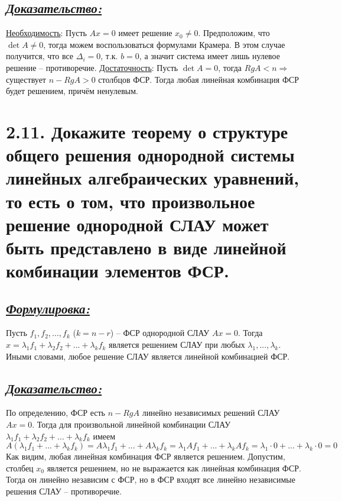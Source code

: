 \documentclass{article}
\begin{document}
\subsection*{\Large \underline{\textit{Доказательство: }}}
\underline{Необходимость}:
\newline Пусть $Ax = 0$ имеет решение $x_0 \ne 0$. Предположим, что $\det{A} \ne 0$, тогда можем воспользоваться формулами Крамера. В этом случае получится, что все $\Delta_i = 0$, т.к. $b = 0$, а значит система имеет лишь нулевое решение -- противоречие.
\newline \underline{Достаточность}:
\newline Пусть $\det{A} = 0$, тогда $RgA < n \Rightarrow$ существует $n - RgA > 0$ столбцов ФСР. Тогда любая линейная комбинация ФСР будет решением, причём ненулевым. 

\section*{\LARGE 2.11. Докажите теорему о структуре общего решения однородной системы линейных алгебраических уравнений, то есть о том, что произвольное решение однородной СЛАУ может быть представлено в виде линейной комбинации элементов ФСР.}
\subsection*{\Large \underline{\textit{Формулировка: }}}
Пусть $f_1, f_2, ..., f_k$ ($k = n - r$) -- ФСР однородной СЛАУ $Ax = 0$. Тогда $x = \lambda_1f_1 + \lambda_2f_2 + ... + \lambda_kf_k$ является решением СЛАУ при любых $\lambda_1, ..., \lambda_k$. Иными словами, любое решение СЛАУ является линейной комбинацией ФСР.

\subsection*{\Large \underline{\textit{Доказательство: }}}
По определению, ФСР есть $n - RgA$ линейно независимых решений СЛАУ $Ax = 0$. Тогда для произвольной линейной комбинации СЛАУ $\lambda_1f_1 + \lambda_2f_2 + ... + \lambda_kf_k$ имеем 
$$
A(\lambda_1f_1 + ... + \lambda_kf_k) = A\lambda_1f_1 + ... + A\lambda_kf_k = \lambda_1Af_1 + ... + \lambda_kAf_k = \lambda_1\cdot 0 + ... + \lambda_k\cdot 0 = 0
$$
Как видим, любая линейная комбинация ФСР является решением. 
\newline Допустим, столбец $x_0$ является решением, но не выражается как линейная комбинация ФСР. Тогда он линейно независим с ФСР, но в ФСР входят все линейно независимые решения СЛАУ -- противоречие.
\end{document}
